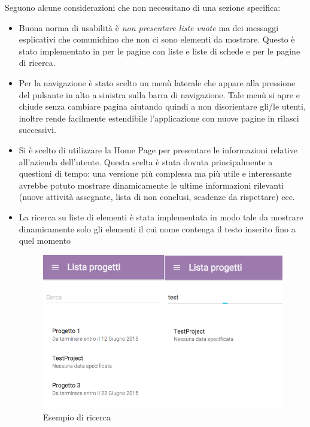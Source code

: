 Seguono alcune considerazioni che non necessitano di una sezione specifica:

\begin{itemize}
\item Buona norma di usabilità è \textit{non presentare liste vuote} ma dei messaggi esplicativi
che comunichino che non ci sono elementi da mostrare. Questo è stato implementato in
\fiscoloMobile{} per le pagine con liste e liste di schede e per le pagine di ricerca.
\item Per la navigazione è stato scelto un menù laterale che appare alla pressione
del pulsante in alto a sinistra sulla barra di navigazione. Tale menù si apre e chiude senza
cambiare pagina aiutando quindi a non disorientare gli/le utenti, inoltre rende facilmente
estendibile l'applicazione con nuove pagine in rilasci successivi.
\item Si è scelto di utilizzare la Home Page per presentare le informazioni relative all'azienda
dell'utente. Questa scelta è stata dovuta principalmente a questioni di tempo: una versione
più complessa ma più utile e interessante avrebbe potuto mostrare dinamicamente le ultime
informazioni rilevanti (nuove attività assegnate, lista di  non conclusi, scadenze
da rispettare) ecc.
\item La ricerca su liste di elementi è stata implementata in modo tale da mostrare dinamicamente
solo gli elementi il cui nome contenga il testo inserito fino a quel momento

\begin{figure}[H]\label{imgSearch}
	\centering
	\includegraphics[width=.8\columnwidth]{images/search.png}
	\caption{Esempio di ricerca}
\end{figure}

\end{itemize}
